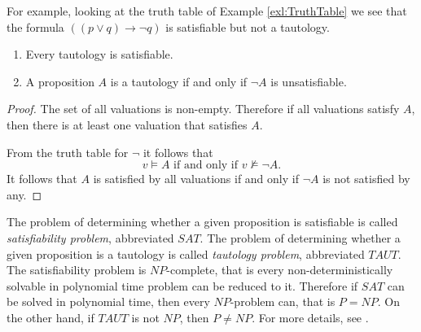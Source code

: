 \begin{page}
\setcounter{section}{1}
\setcounter{subsection}{3}
\setcounter{dfn}{5}
\label{portion:366}


For example, looking at the truth table of Example \ref{exl:TruthTable} we see that the formula $((p \vee q) \to \neg q)$ is satisfiable but not a tautology.


\end{page}

\begin{page}
\setcounter{section}{1}
\setcounter{subsection}{3}
\setcounter{dfn}{6}
\label{portion:368}

\begin{thm}
\begin{enumerate}
\item
Every tautology is satisfiable.
\item
A proposition $A$ is a tautology if and only if $\neg A$ is unsatisfiable.
\end{enumerate}
\end{thm}

\end{page}

\begin{page}
\setcounter{section}{1}
\setcounter{subsection}{3}
\setcounter{dfn}{6}
\label{portion:369}

\begin{proof}
The set of all valuations is non-empty.
Therefore if all valuations satisfy $A$, then there is at least one valuation that satisfies $A$.

From the truth table for $\neg$ it follows that
\[
v \vDash A \text{ if and only if } v \nvDash \neg A.
\]
It follows that $A$ is satisfied by all valuations if and only if $\neg A$ is not satisfied by any.
\end{proof}

The problem of determining whether a given proposition is satisfiable is called \emph{satisfiability problem}, abbreviated $SAT$.
The problem of determining whether a given proposition is a tautology is called \emph{tautology problem}, abbreviated $TAUT$.
The satisfiability problem is $NP$-complete, that is every non-deterministically solvable in polynomial time problem can be reduced to it.
Therefore if $SAT$ can be solved in polynomial time, then every $NP$-problem can, that is $P=NP$.
On the other hand, if $TAUT$ is not $NP$, then $P \ne NP$.
For more details, see \cite[Section 3.3.5]{Gallier}.


\end{page}

